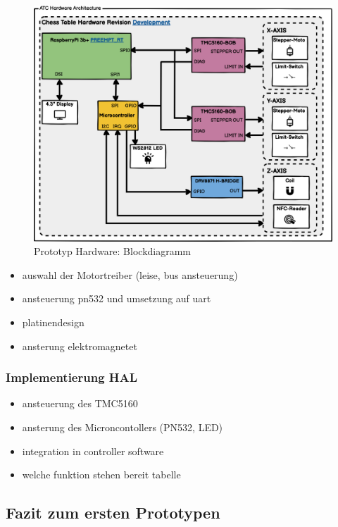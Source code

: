 \begin{figure}
\centering
\includegraphics{images/ATC_Hardware_Architecture_DK.png}
\caption{Prototyp Hardware: Blockdiagramm
\label{ATC_Hardware_Architecture_DK}}
\end{figure}

\begin{itemize}
\tightlist
\item
  auswahl der Motortreiber (leise, bus ansteuerung)
\item
  ansteuerung pn532 und umsetzung auf uart
\item
  platinendesign
\item
  ansterung elektromagnetet
\end{itemize}

\hypertarget{implementierung-hal}{%
\subsubsection{Implementierung HAL}\label{implementierung-hal}}

\begin{itemize}
\tightlist
\item
  ansteuerung des TMC5160
\item
  ansterung des Microncontollers (PN532, LED)
\item
  integration in controller software
\item
  welche funktion stehen bereit tabelle
\end{itemize}

\hypertarget{fazit-zum-ersten-prototypen}{%
\subsection{Fazit zum ersten
Prototypen}\label{fazit-zum-ersten-prototypen}}

